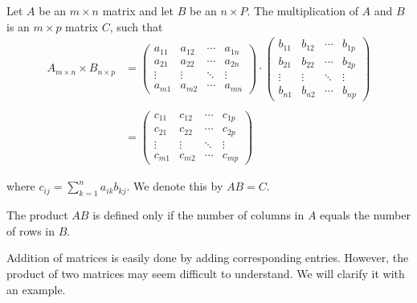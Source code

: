 \documentclass{subfile}
\begin{document}
	\begin{definition}\label{def:matrixproduct}
		Let $A$ be an $m\times n$ matrix and let $B$ be an $n\times P$. The multiplication of $A$ and $B$ is an $m \times p$ matrix $C$, such that
		\begin{align*}
		{A_{m \times n}} \times {B_{n \times p}} &= \begin{pmatrix}
			{{a_{11}}}&{{a_{12}}}& \cdots &{{a_{1n}}}\\
			{{a_{21}}}&{{a_{22}}}& \cdots &{{a_{2n}}}\\
			\vdots & \vdots & \ddots & \vdots \\
			{{a_{m1}}}&{{a_{m2}}}& \cdots &{{a_{mn}}}
				\end{pmatrix} \cdot \begin{pmatrix}
			{{b_{11}}}&{{b_{12}}}& \cdots &{{b_{1p}}}\\
			{{b_{21}}}&{{b_{22}}}& \cdots &{{b_{2p}}}\\
			\vdots & \vdots & \ddots & \vdots \\
			{{b_{n1}}}&{{b_{n2}}}& \cdots &{{b_{np}}}
			\end{pmatrix}\\
		\\
		&= \begin{pmatrix}
			{{c_{11}}}&{{c_{12}}}& \cdots &{{c_{1p}}}\\
			{{c_{21}}}&{{c_{22}}}& \cdots &{{c_{2p}}}\\
			\vdots & \vdots & \ddots & \vdots \\
			{{c_{m1}}}&{{c_{m2}}}& \cdots &{{c_{mp}}}
		\end{pmatrix}
		\end{align*}

		where $c_{ij}= \displaystyle\sum_{k=1}^{n} a_{ik}b_{kj}$. We denote this by $AB=C$.
	\end{definition}


	\begin{note}
		The product $AB$ is defined only if the number of columns in $A$ equals the number of rows in $B$.
	\end{note}


Addition of matrices is easily done by adding corresponding entries. However, the product of two matrices may seem difficult to understand. We will clarify it with an example.
\end{document}
